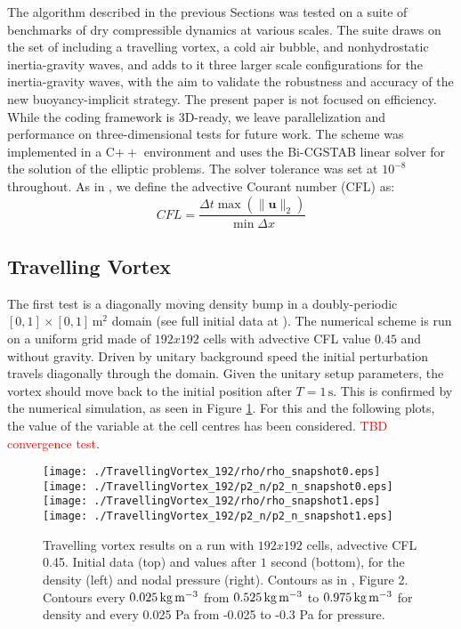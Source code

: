 \documentclass{ametsoc}
\theoremstyle{definition}
\newcommand{\benacchio}[1]{\textcolor{red}{#1}}
\begin{document}
The algorithm described in the previous Sections was tested on a suite of benchmarks of dry compressible dynamics at various scales. The suite draws on the set of \cite{Benacchio2014,BenacchioEtAl2014} including a travelling vortex, a cold air bubble, and nonhydrostatic inertia-gravity waves, and adds to it three larger scale configurations for the inertia-gravity waves, with the aim to validate the robustness and accuracy of the new buoyancy-implicit strategy. The present paper is not focused on efficiency. While the coding framework is 3D-ready, we leave parallelization and performance on three-dimensional tests for future work. The scheme was implemented in a C$++$ environment and uses the Bi-CGSTAB linear solver \citep{Vandervorst1992} for the solution of the elliptic problems. The solver tolerance was set at $10^{-8}$ throughout. As in \cite{BenacchioEtAl2014}, we define the advective Courant number (CFL) as:
%
\begin{equation}
 CFL=\dfrac{\Delta t \max(\|\mathbf{u}\|_2)}{\min{\Delta x}}
\end{equation}
%

\subsection{Travelling Vortex}

The first test is a diagonally moving density bump in a doubly-periodic $[0,1]\times[0,1]\,\textrm{m}^2$ domain (see full initial data at \cite{KadiogluEtAl2008, Benacchio2014}). The numerical scheme is run on a uniform grid made of $192x192$ cells with advective CFL value $0.45$ and without gravity. Driven by unitary background speed the initial perturbation travels diagonally through the domain. Given the unitary setup parameters, the vortex should move back to the initial position after $T=1\,\textrm{s}$. This is confirmed by the numerical simulation, as seen in Figure \ref{fig:trav_vortex_res}. For this and the following plots, the value of the variable at the cell centres has been considered. \benacchio{TBD convergence test}.

\begin{figure}
\centering
 \texttt{[image: ./TravellingVortex\_192/rho/rho\_snapshot0.eps]}\texttt{[image: ./TravellingVortex\_192/p2\_n/p2\_n\_snapshot0.eps]}\\
 \texttt{[image: ./TravellingVortex\_192/rho/rho\_snapshot1.eps]}
 \texttt{[image: ./TravellingVortex\_192/p2\_n/p2\_n\_snapshot1.eps]}
 \caption{Travelling vortex results on a run with $192x192$ cells, advective CFL 0.45. Initial data (top) and values after $1$ second (bottom), for the density (left) and nodal pressure (right). Contours as in \cite{Benacchio2014}, Figure 2.  Contours every $0.025\,\textrm{kg\,m$^{-3}$}$
 from $0.525\,\textrm{kg\,m$^{-3}$}$ to $0.975\,\textrm{kg\,m$^{-3}$}$ for density and every 0.025 Pa from
-0.025 to -0.3 Pa for pressure.}
 \label{fig:trav_vortex_res}
\end{figure}
\end{document}
